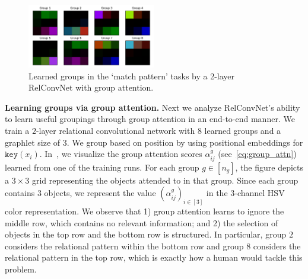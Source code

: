 \begin{figure}
    \centering
    \includegraphics[width=0.5\textwidth]{figs/group_attn_figs/match_patt_group_attn_map.pdf}
    \caption{Learned groups in the `match pattern' tasks by a 2-layer RelConvNet with group attention.}\label{fig:matchpatt_groupattn}
\end{figure}
\textbf{Learning groups via group attention.} Next we analyze RelConvNet's ability to learn useful groupings through group attention in an end-to-end manner. We train a $2$-layer relational convolutional network with $8$ learned groups and a graphlet size of $3$. We group based on position by using positional embeddings for $\mathtt{key}(x_i)$.
In~, we visualize the group attention scores $\alpha_{ij}^g$ (see~\cref{eq:group_attn}) learned from one of the training runs. For each group $g \in [n_g]$, the figure depicts a $3 \times 3$ grid representing the objects attended to in that group. Since each group contains $3$ objects, we represent the value $(\alpha_{ij}^g)_{i \in [3]}$ in the $3$-channel HSV color representation. We observe that 1) group attention learns to ignore the middle row, which contains no relevant information; and 2) the selection of objects in the top row and the bottom row is structured. In particular, group $2$ considers the relational pattern within the bottom row and group $8$ considers the relational pattern in the top row, which is exactly how a human would tackle this problem.
